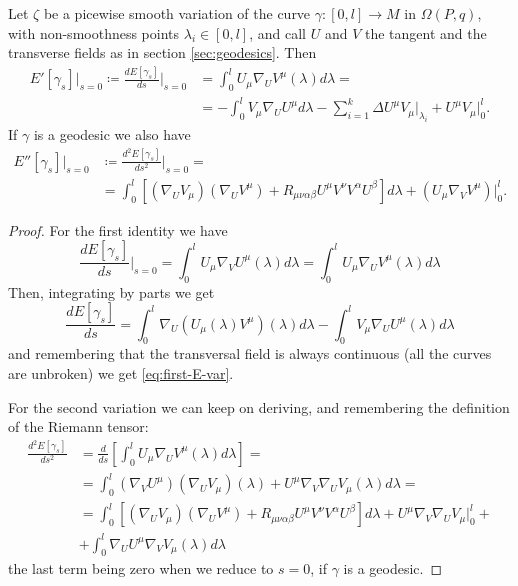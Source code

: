 \begin{lemma}
	Let \(\zeta\) be a picewise smooth variation of the curve \(\gamma: [0, l] \rightarrow M\)  in \(\Omega(P, q)\), with non-smoothness points \(\lambda_i \in [0, l]\), and call \(U\) and \(V\) the tangent and the transverse fields as in section \ref{sec:geodesics}. Then
	\begin{align}
		E'[\gamma_s]\vert_{s = 0} \coloneqq \frac{dE[\gamma_s]}{ds}\Big\vert_{s = 0} &= 
		\int_{0}^{l} U_{\mu}\nabla_UV^{\mu}(\lambda) d\lambda = \\
		&= - \int_{0}^{l}  V_{\mu}\nabla_UU^{\mu}d\lambda - \sum_{i = 1}^{k} \Delta U^{\mu}V_{\mu}\Big\vert_{\lambda_i} + U^{\mu}V_{\mu}\Big\vert^l_0.
		\label{eq:first-E-var}
	\end{align}
	If \(\gamma\) is a geodesic we also have
	\begin{align}
		E''[\gamma_s]\vert_{s = 0} &\coloneqq \frac{d^2E[\gamma_s]}{ds^2}\Big\vert_{s = 0} = \\
		&= \int_{0}^{l} \left[(\nabla_UV_{\mu})(\nabla_UV^{\mu}) + R_{\mu\nu\alpha\beta}U^{\mu}V^{\nu}V^{\alpha}U^{\beta}\right] d\lambda + (U_{\mu}\nabla_VV^{\mu})\Big\vert_0^l.
		\label{eq:second-E-var}
	\end{align}
	
\end{lemma}

\begin{proof}
	For the first identity we have
	\begin{equation*}
		\frac{dE[\gamma_s]}{ds}\Big\vert_{s = 0}  = \int_{0}^{l} U_{\mu}\nabla_VU^{\mu}(\lambda) d\lambda = \int_{0}^{l} U_{\mu}\nabla_UV^{\mu}(\lambda) d\lambda
	\end{equation*}
Then, integrating by parts we get 
\begin{equation*}
	\frac{dE[\gamma_s]}{ds} = \int_{0}^{l} \nabla_U\left(U_{\mu}(\lambda)V^{\mu}\right)(\lambda) d\lambda - \int_{0}^{l} V_{\mu}\nabla_UU^{\mu}(\lambda) d\lambda
\end{equation*}
 and remembering that the transversal field is always continuous (all the curves are unbroken) we get \eqref{eq:first-E-var}.
 
 For the second variation we can keep on deriving, and remembering the definition of the Riemann tensor:
 \begin{align*}
 	\frac{d^2E[\gamma_s]}{ds^2} &= \frac{d}{ds} \left[\int_{0}^{l} U_{\mu}\nabla_UV^{\mu}(\lambda) d\lambda\right] = \\
 	&= \int_{0}^{l} (\nabla_VU^{\mu})(\nabla_UV_{\mu})(\lambda) + U^{\mu} \nabla_V\nabla_UV_{\mu} (\lambda) d\lambda=\\
 	&= \int_{0}^{l} \left[(\nabla_UV_{\mu})(\nabla_UV^{\mu}) + R_{\mu\nu\alpha\beta}U^{\mu}V^{\nu}V^{\alpha}U^{\beta}\right] d\lambda + U^{\mu} \nabla_V\nabla_UV_{\mu} \Big\vert_0^l +\\
 	&+  \int_{0}^{l} \nabla_UU^{\mu} \nabla_VV_{\mu} (\lambda) d\lambda
 \end{align*}
	the last term being zero when we reduce to \(s = 0\), if \(\gamma\) is a geodesic.

\end{proof}


